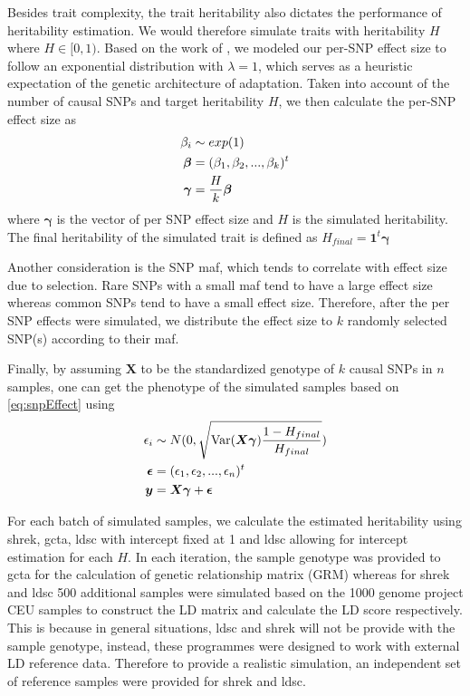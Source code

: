 			Besides trait complexity, the trait heritability also dictates the performance of heritability estimation. 
			We would therefore simulate traits with heritability $H$ where $H\in[0,1)$. 
			Based on the work of \citet{Orr1998}, we modeled our per-\gls{SNP} effect size to follow an exponential distribution with $\lambda=1$, which serves as a heuristic expectation of the genetic architecture of adaptation.
			Taken into account of the number of causal \glspl{SNP} and target heritability $H$, we then calculate the per-\gls{SNP} effect size as
			\begin{align}
			\beta_i &\sim exp(1)\notag\\
			\boldsymbol{\beta}&=(\beta_1,\beta_2,...,\beta_k)^t\notag\\
			\boldsymbol{\gamma} &= \frac{H}{k}\boldsymbol{\beta}
			\label{eq:snpEffect}
			\end{align}
			where $\boldsymbol{\gamma}$ is the vector of per SNP effect size and $H$ is the simulated heritability.
			The final heritability of the simulated trait is defined as $H_{final}=\boldsymbol{1}^t\boldsymbol{\gamma}$
			
			Another consideration is the \gls{SNP} \gls{maf}, which tends to correlate with effect size\citep{Manolio2009} due to selection.
			Rare \glspl{SNP} with a small \gls{maf} tend to have a large effect size whereas common \glspl{SNP} tend to have a small effect size. 
			Therefore, after the per \gls{SNP} effects were simulated, we distribute the effect size to $k$ randomly selected \gls{SNP}(s) according to their \gls{maf}.
		
			Finally, by assuming $\boldsymbol{X}$ to be the standardized genotype of $k$ causal SNPs in $n$ samples, one can get the phenotype of the simulated samples based on \cref{eq:snpEffect} using
			\begin{align}
			\epsilon_i&\sim N(0,\sqrt{\mathrm{Var}(\boldsymbol{X\gamma})\frac{1-H_{final}}{H_{final}}} )\notag\\
			\boldsymbol{\epsilon} &= (\epsilon_1,\epsilon_2,...,\epsilon_n)^t\notag\\
			\boldsymbol{y} &= \boldsymbol{X\gamma}+\boldsymbol{\epsilon}
			\label{eq:simulationOfPhenotype}
			\end{align}
			
			For each batch of simulated samples, we calculate the estimated heritability using \gls{shrek}, \gls{gcta}, \gls{ldsc} with intercept fixed at 1 and \gls{ldsc} allowing for intercept estimation for each $H$.
			In each iteration, the sample genotype was provided to \gls{gcta} for the calculation of genetic relationship matrix (GRM) whereas for \gls{shrek} and \gls{ldsc} 500 additional samples were simulated based on the 1000 genome project \gls{CEU} samples\parencite{Project2012} to construct the \gls{LD} matrix and calculate the \gls{LD} score respectively. 
			This is because in general situations, \gls{ldsc} and \gls{shrek} will not be provide with the sample genotype, instead, these programmes were designed to work with external \gls{LD} reference data.
			Therefore to provide a realistic simulation, an independent set of reference samples were provided for \gls{shrek} and \gls{ldsc}.
			  
